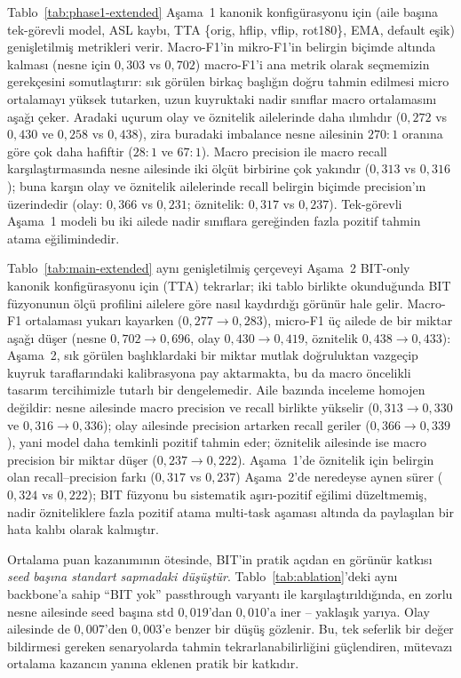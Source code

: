 \documentclass[conference]{IEEEtran}
\begin{document}
Tablo~\ref{tab:phase1-extended} Aşama~1 kanonik konfigürasyonu için (aile başına tek-görevli model, ASL kaybı, TTA \{orig, hflip, vflip, rot180\}, EMA, default eşik) genişletilmiş metrikleri verir. Macro-F1'in mikro-F1'in belirgin biçimde altında kalması (nesne için $0{,}303$ vs $0{,}702$) macro-F1'i ana metrik olarak seçmemizin gerekçesini somutlaştırır: sık görülen birkaç başlığın doğru tahmin edilmesi micro ortalamayı yüksek tutarken, uzun kuyruktaki nadir sınıflar macro ortalamasını aşağı çeker. Aradaki uçurum olay ve öznitelik ailelerinde daha ılımlıdır ($0{,}272$ vs $0{,}430$ ve $0{,}258$ vs $0{,}438$), zira buradaki imbalance nesne ailesinin $270{:}1$ oranına göre çok daha hafiftir ($28{:}1$ ve $67{:}1$). Macro precision ile macro recall karşılaştırmasında nesne ailesinde iki ölçüt birbirine çok yakındır ($0{,}313$ vs $0{,}316$); buna karşın olay ve öznitelik ailelerinde recall belirgin biçimde precision'ın üzerindedir (olay: $0{,}366$ vs $0{,}231$; öznitelik: $0{,}317$ vs $0{,}237$). Tek-görevli Aşama~1 modeli bu iki ailede nadir sınıflara gereğinden fazla pozitif tahmin atama eğilimindedir.



Tablo~\ref{tab:main-extended} aynı genişletilmiş çerçeveyi Aşama~2 BIT-only kanonik konfigürasyonu için (TTA) tekrarlar; iki tablo birlikte okunduğunda BIT füzyonunun ölçü profilini ailelere göre nasıl kaydırdığı görünür hale gelir. Macro-F1 ortalaması yukarı kayarken ($0{,}277 \to 0{,}283$), micro-F1 üç ailede de bir miktar aşağı düşer (nesne $0{,}702 \to 0{,}696$, olay $0{,}430 \to 0{,}419$, öznitelik $0{,}438 \to 0{,}433$): Aşama~2, sık görülen başlıklardaki bir miktar mutlak doğruluktan vazgeçip kuyruk taraflarındaki kalibrasyona pay aktarmakta, bu da macro öncelikli tasarım tercihimizle tutarlı bir dengelemedir. Aile bazında inceleme homojen değildir: nesne ailesinde macro precision ve recall birlikte yükselir ($0{,}313 \to 0{,}330$ ve $0{,}316 \to 0{,}336$); olay ailesinde precision artarken recall geriler ($0{,}366 \to 0{,}339$), yani model daha temkinli pozitif tahmin eder; öznitelik ailesinde ise macro precision bir miktar düşer ($0{,}237 \to 0{,}222$). Aşama~1'de öznitelik için belirgin olan recall--precision farkı ($0{,}317$ vs $0{,}237$) Aşama~2'de neredeyse aynen sürer ($0{,}324$ vs $0{,}222$); BIT füzyonu bu sistematik aşırı-pozitif eğilimi düzeltmemiş, nadir özniteliklere fazla pozitif atama multi-task aşaması altında da paylaşılan bir hata kalıbı olarak kalmıştır.

Ortalama puan kazanımının ötesinde, BIT'in pratik açıdan en görünür katkısı \emph{seed başına standart sapmadaki düşüştür}. Tablo~\ref{tab:ablation}'deki aynı backbone'a sahip ``BIT yok'' passthrough varyantı ile karşılaştırıldığında, en zorlu nesne ailesinde seed başına std $0{,}019$'dan $0{,}010$'a iner -- yaklaşık yarıya. Olay ailesinde de $0{,}007$'den $0{,}003$'e benzer bir düşüş gözlenir. Bu, tek seferlik bir değer bildirmesi gereken senaryolarda tahmin tekrarlanabilirliğini güçlendiren, mütevazı ortalama kazancın yanına eklenen pratik bir katkıdır.
\end{document}
